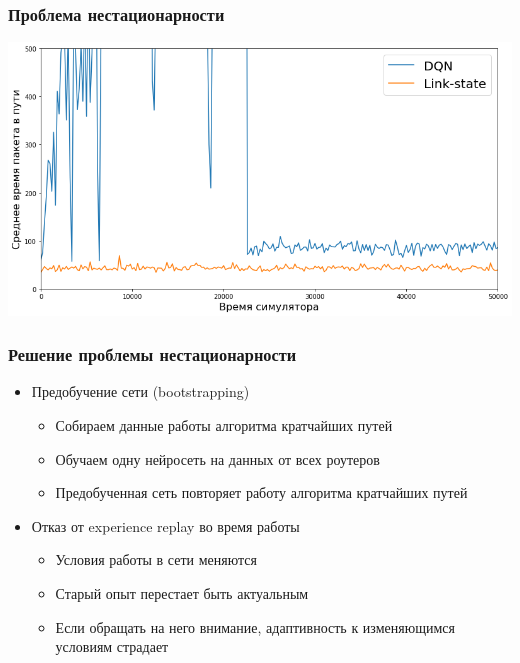 \documentclass{beamer}
\begin{document}

\begin{frame}
  \frametitle{Проблема нестационарности}
  \includegraphics[width=\textwidth]{non-convergence}
\end{frame}


\begin{frame}
  \frametitle{Решение проблемы нестационарности}
  \begin{itemize}
  \item Предобучение сети (bootstrapping)
    \begin{itemize}
      \item Собираем данные работы алгоритма кратчайших путей
      \item Обучаем одну нейросеть на данных от всех роутеров
      \item Предобученная сеть повторяет работу алгоритма кратчайших путей
    \end{itemize}
  \item Отказ от experience replay во время работы
    \begin{itemize}
    \item Условия работы в сети меняются
    \item Старый опыт перестает быть актуальным
    \item Если обращать на него внимание, адаптивность к изменяющимся условиям страдает
    \end{itemize}
  \end{itemize}
\end{frame}

\end{document}
